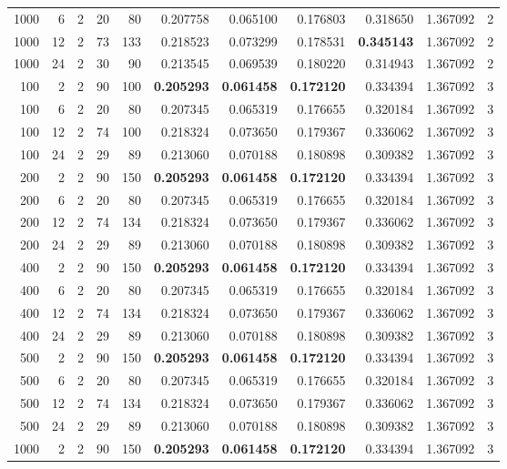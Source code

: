 \begin{table}
\begin{tabular}{rrrrrrrrrrr}
1000 & 6 & 2 & 20 & 80 & 0.207758 & 0.065100 & 0.176803 & 0.318650 & 1.367092 & 2 \\
1000 & 12 & 2 & 73 & 133 & 0.218523 & 0.073299 & 0.178531 & \textbf{0.345143} & 1.367092 & 2 \\
1000 & 24 & 2 & 30 & 90 & 0.213545 & 0.069539 & 0.180220 & 0.314943 & 1.367092 & 2 \\
100 & 2 & 2 & 90 & 100 & \textbf{0.205293} & \textbf{0.061458} & \textbf{0.172120} & 0.334394 & 1.367092 & 3 \\
100 & 6 & 2 & 20 & 80 & 0.207345 & 0.065319 & 0.176655 & 0.320184 & 1.367092 & 3 \\
100 & 12 & 2 & 74 & 100 & 0.218324 & 0.073650 & 0.179367 & 0.336062 & 1.367092 & 3 \\
100 & 24 & 2 & 29 & 89 & 0.213060 & 0.070188 & 0.180898 & 0.309382 & 1.367092 & 3 \\
200 & 2 & 2 & 90 & 150 & \textbf{0.205293} & \textbf{0.061458} & \textbf{0.172120} & 0.334394 & 1.367092 & 3 \\
200 & 6 & 2 & 20 & 80 & 0.207345 & 0.065319 & 0.176655 & 0.320184 & 1.367092 & 3 \\
200 & 12 & 2 & 74 & 134 & 0.218324 & 0.073650 & 0.179367 & 0.336062 & 1.367092 & 3 \\
200 & 24 & 2 & 29 & 89 & 0.213060 & 0.070188 & 0.180898 & 0.309382 & 1.367092 & 3 \\
400 & 2 & 2 & 90 & 150 & \textbf{0.205293} & \textbf{0.061458} & \textbf{0.172120} & 0.334394 & 1.367092 & 3 \\
400 & 6 & 2 & 20 & 80 & 0.207345 & 0.065319 & 0.176655 & 0.320184 & 1.367092 & 3 \\
400 & 12 & 2 & 74 & 134 & 0.218324 & 0.073650 & 0.179367 & 0.336062 & 1.367092 & 3 \\
400 & 24 & 2 & 29 & 89 & 0.213060 & 0.070188 & 0.180898 & 0.309382 & 1.367092 & 3 \\
500 & 2 & 2 & 90 & 150 & \textbf{0.205293} & \textbf{0.061458} & \textbf{0.172120} & 0.334394 & 1.367092 & 3 \\
500 & 6 & 2 & 20 & 80 & 0.207345 & 0.065319 & 0.176655 & 0.320184 & 1.367092 & 3 \\
500 & 12 & 2 & 74 & 134 & 0.218324 & 0.073650 & 0.179367 & 0.336062 & 1.367092 & 3 \\
500 & 24 & 2 & 29 & 89 & 0.213060 & 0.070188 & 0.180898 & 0.309382 & 1.367092 & 3 \\
1000 & 2 & 2 & 90 & 150 & \textbf{0.205293} & \textbf{0.061458} & \textbf{0.172120} & 0.334394 & 1.367092 & 3 \\

\end{tabular}
\end{table}
